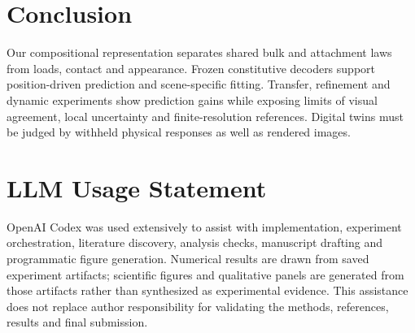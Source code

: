 \documentclass[10pt,twocolumn,letterpaper]{article}
\begin{document}
\section{Conclusion}
Our compositional representation separates shared bulk and attachment laws from loads, contact and appearance. Frozen constitutive decoders support position-driven prediction and scene-specific fitting. Transfer, refinement and dynamic experiments show prediction gains while exposing limits of visual agreement, local uncertainty and finite-resolution references. Digital twins must be judged by withheld physical responses as well as rendered images.

\clearpage
\section*{LLM Usage Statement}
OpenAI Codex was used extensively to assist with implementation, experiment orchestration, literature discovery, analysis checks, manuscript drafting and programmatic figure generation. Numerical results are drawn from saved experiment artifacts; scientific figures and qualitative panels are generated from those artifacts rather than synthesized as experimental evidence. This assistance does not replace author responsibility for validating the methods, references, results and final submission.
{\small}
\end{document}
